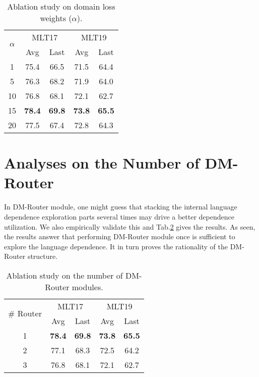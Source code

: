 \documentclass[10pt,twocolumn,letterpaper]{article}
\begin{document}
\begin{table}[]
\begin{center}
\begin{tabular}{c|cc|cc}
\hline
\multirow{2}{*}{$\alpha$} & \multicolumn{2}{c|}{MLT17}    & \multicolumn{2}{c}{MLT19}     \\ \cline{2-5} 
                           & Avg           & Last          & Avg           & Last          \\ \hline
1                          & 75.4          & 66.5          & 71.5          & 64.4          \\
5                          & 76.3          & 68.2          & 71.9          & 64.0          \\
10                         & 76.8          & 68.1          & 72.1          & 62.7          \\
15                         & \textbf{78.4} & \textbf{69.8} & \textbf{73.8} & \textbf{65.5} \\
20                         & 77.5          & 67.4          & 72.8          & 64.3          \\ \hline
\end{tabular}
\end{center}
\caption{Ablation study on domain loss weights ($\alpha$).}
\label{table:para_a}
\end{table}


\section{Analyses on the Number of DM-Router}

In DM-Router module, one might guess that stacking the internal language dependence exploration parts several times may drive a better dependence utilization. We also empirically validate this and Tab.\ref{table:num_dm} gives the results. As seen, the results answer that performing DM-Router module once is sufficient to explore the language dependence. It in turn proves the rationality of the DM-Router structure.
\begin{table}[]
\begin{center}
\begin{tabular}{c|cc|cc}
\hline
\multirow{2}{*}{\# Router} & \multicolumn{2}{c|}{MLT17}    & \multicolumn{2}{c}{MLT19}     \\ \cline{2-5} 
                         & Avg           & Last          & Avg           & Last          \\ \hline
1                         & \textbf{78.4} & \textbf{69.8} & \textbf{73.8} & \textbf{65.5} \\
2                         & 77.1          & 68.3          & 72.5          & 64.2          \\
3                         & 76.8          & 68.1          & 72.1          & 62.7          \\
\hline       
\end{tabular}
\end{center}
\caption{Ablation study on the number of DM-Router modules.}
\label{table:num_dm}
\end{table}
\end{document}

